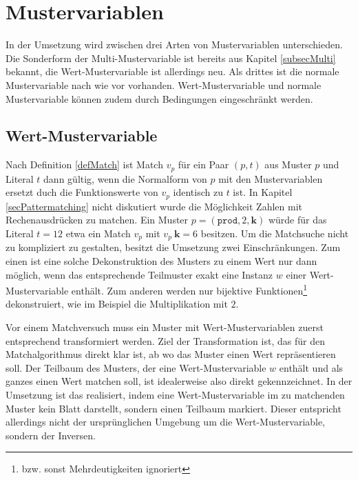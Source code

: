 \section{Mustervariablen} \label{subsecMustervariablen}
In der Umsetzung wird zwischen drei Arten von Mustervariablen unterschieden. Die Sonderform der Multi-Mustervariable ist bereits aus Kapitel \ref{subsecMulti} bekannt, die Wert-Mustervariable ist allerdings neu. Als drittes ist die normale Mustervariable nach wie vor vorhanden. Wert-Mustervariable und normale Mustervariable können zudem durch Bedingungen eingeschränkt werden.

\subsection{Wert-Mustervariable} \label{subsubsecWertMustervariable}
Nach Definition \ref{defMatch} ist Match $v_p$ für ein Paar $(p, t)$ aus Muster $p$ und Literal $t$ dann gültig, wenn die Normalform von $p$ mit den Mustervariablen ersetzt duch die Funktionswerte von $v_p$ identisch zu $t$ ist. In Kapitel \ref{secPattermatching} nicht diskutiert wurde die Möglichkeit Zahlen mit Rechenausdrücken zu matchen. Ein Muster $p = (\texttt{prod}, 2, \mathbf k)$ würde für das Literal $t = 12$ etwa ein Match $v_p$ mit $v_p~\mathbf k = 6$ besitzen. Um die Matchsuche nicht zu kompliziert zu gestalten, besitzt die Umsetzung zwei Einschränkungen. Zum einen ist eine solche Dekonstruktion des Musters zu einem Wert nur dann möglich, wenn das entsprechende Teilmuster exakt eine Instanz $w$ einer Wert-Mustervariable enthält. Zum anderen werden nur bijektive Funktionen\footnote{bzw. sonst Mehrdeutigkeiten ignoriert} dekonstruiert, wie im Beispiel die Multiplikation mit $2$. 


Vor einem Matchversuch muss ein Muster mit Wert-Mustervariablen zuerst entsprechend transformiert werden. Ziel der Transformation ist, das für den Matchalgorithmus direkt klar ist, ab wo das Muster einen Wert repräsentieren soll. Der Teilbaum des Musters, der eine Wert-Mustervariable $w$ enthält und als ganzes einen Wert matchen soll, ist idealerweise also direkt gekennzeichnet. In der Umsetzung ist das realisiert, indem eine Wert-Mustervariable im zu matchenden Muster kein Blatt darstellt, sondern einen Teilbaum markiert. Dieser entspricht allerdings nicht der ursprünglichen Umgebung um die Wert-Mustervariable, sondern der Inversen. 

